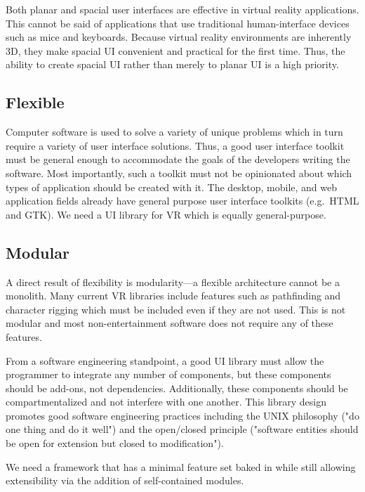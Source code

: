 \documentclass[conference,12pt]{IEEEtran}
\begin{document}
Both planar and spacial user interfaces are effective in virtual reality
applications. This cannot be said of applications that use traditional
human-interface devices such as mice and keyboards. Because virtual reality
environments are inherently 3D, they make spacial UI convenient and practical
for the first time. Thus, the ability to create spacial UI rather than merely to
planar UI is a high priority.

\subsection{Flexible}\label{sec:flexible}

Computer software is used to solve a variety of unique problems which in turn
require a variety of user interface solutions. Thus, a good user interface
toolkit must be general enough to accommodate the goals of the developers
writing the software. Most importantly, such a toolkit must not be opinionated
about which types of application should be created with it. The desktop, mobile,
and web application fields already have general purpose user interface toolkits
(e.g.\ HTML and GTK). We need a UI library for VR which is equally
general-purpose.

\subsection{Modular}\label{sec:modular}

A direct result of flexibility is modularity---a flexible architecture cannot be
a monolith. Many current VR libraries include features such as pathfinding and
character rigging which must be included even if they are not used. This is not
modular and most non-entertainment software does not require any of these
features.

From a software engineering standpoint, a good UI library must allow the
programmer to integrate any number of components, but these components should
be add-ons, not dependencies. Additionally, these components should be
compartmentalized and not interfere with one another. This library design
promotes good software engineering practices including the UNIX philosophy ("do
one thing and do it well") and the open/closed principle ("software entities
should be open for extension but closed to modification").

We need a framework that has a minimal feature set baked in while still allowing
extensibility via the addition of self-contained modules.
\end{document}
